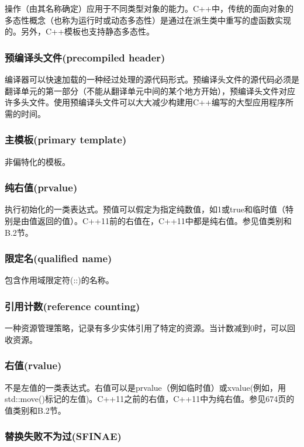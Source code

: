 操作（由其名称确定）应用于不同类型对象的能力。C++中，传统的面向对象的多态性概念（也称为运行时或动态多态性）是通过在派生类中重写的虚函数实现的。另外，C++模板也支持静态多态性。

\subsubsection{预编译头文件(precompiled header)}

编译器可以快速加载的一种经过处理的源代码形式。预编译头文件的源代码必须是翻译单元的第一部分（不能从翻译单元中间的某个地方开始），预编译头文件对应许多头文件。使用预编译头文件可以大大减少构建用C++编写的大型应用程序所需的时间。

\subsubsection{主模板(primary template)}

非偏特化的模板。

\subsubsection{纯右值(prvalue)}

执行初始化的一类表达式。预值可以假定为指定纯数值，如1或true和临时值（特别是由值返回的值）。C++11前的右值在，C++11中都是纯右值。参见值类别和B.2节。

\subsubsection{限定名(qualified name)}

包含作用域限定符(::)的名称。

\subsubsection{引用计数(reference counting)}

一种资源管理策略，记录有多少实体引用了特定的资源。当计数减到0时，可以回收资源。

\subsubsection{右值(rvalue)}

不是左值的一类表达式。右值可以是prvalue（例如临时值）或xvalue(例如，用std::move()标记的左值)。C++11之前的右值，C++11中为纯右值。参见674页的值类别和B.2节。

\subsubsection{替换失败不为过(SFINAE)}

